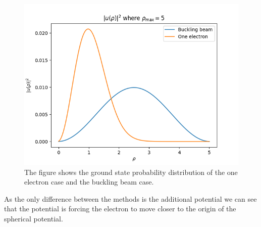\documentclass[american,a4paper,12pt]{article}
\begin{document}
\begin{figure}[H]
    \centering
    \includegraphics[width = \textwidth]{figures/eigvals_0and1e.png}
    \caption{The figure shows the ground state probability distribution of the one electron case and the buckling beam case.}
    \label{fig:eigvec01}
\end{figure} 
As the only difference between the methods is the additional potential we can see that the potential is forcing the electron to move closer to the origin of the spherical potential. 
\end{document}
